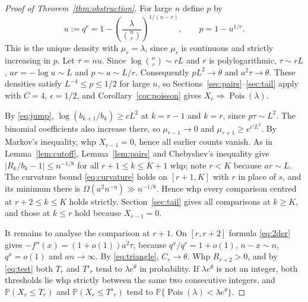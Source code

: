 \documentclass[11pt]{article}
\theoremstyle{remark}
\newcommand{\PP}{\mathbb P}
\newcommand{\Pois}{\operatorname{Pois}}
\begin{document}
\begin{proof}[Proof of Theorem~\ref{thm:obstruction}]
For large $n$ define $p$ by
\begin{equation}
 u:=q^r=1-\left(\frac{\lambda}{\binom nr}\right)^{1/(n-r)},
 \qquad p=1-u^{1/r}.
 \label{eq:tune}
\end{equation}
This is the unique density with $\mu_r=\lambda$, since $\mu_r$ is continuous and strictly increasing in $p$. Let $\tau=nu$. Since $\log\binom nr\sim rL$ and $r$ is polylogarithmic, $\tau\sim rL$, $ar=-\log u\sim L$ and $p\sim a\sim L/r$. Consequently $pL^2\to\theta$ and $a^2\tau\to\theta$. These densities satisfy $L^{-4}\le p\le1/2$ for large $n$, so Sections~\ref{sec:pairs}--\ref{sec:tail} apply with $C=4$, $\epsilon=1/2$, and Corollary~\ref{cor:poisson} gives $X_r\Rightarrow\Pois(\lambda)$.

By \eqref{eq:jump}, $\log(b_{k+1}/b_k)\ge cL^2$ at $k=r-1$ and $k=r$, since $p\tau\sim L^2$. The binomial coefficients also increase there, so $\mu_{r-1}\to0$ and $\mu_{r+1}\ge e^{c'L^2}$. By Markov's inequality, whp $X_{r-1}=0$, hence all earlier counts vanish. As in Lemma~\ref{lem:cutoff}, Lemma~\ref{lem:pairs} and Chebyshev's inequality give $|R_k/b_k-1|\le n^{-1/8}$ for all $r+1\le k\le K+1$ whp; note $r<K$ because $ar\sim L$. The curvature bound \eqref{eq:curvature} holds on $[r+1,K]$ with $r$ in place of $s$, and its minimum there is $\Omega(a^2n^{-\eta})\gg n^{-1/8}$. Hence whp every comparison centred at $r+2\le k\le K$ holds strictly. Section~\ref{sec:tail} gives all comparisons at $k\ge K$, and those at $k\le r$ hold because $X_{r-1}=0$.

It remains to analyse the comparison at $r+1$. On $[r,r+2]$ formula \eqref{eq:2der} gives $-f''(x)=(1+o(1))a^2\tau$, because $q^x/q^r=1+o(1)$, $n-x\sim n$, $q^x=o(1)$ and $an\to\infty$. By \eqref{eq:triangle}, $C_r\to\theta$. Whp $R_{r+2}>0$, and by \eqref{eq:test} both $T_r$ and $T'_r$ tend to $\lambda e^\theta$ in probability. If $\lambda e^\theta$ is not an integer, both thresholds lie whp strictly between the same two consecutive integers, and $\PP(X_r\le T_r)$ and $\PP(X_r\le T'_r)$ tend to $\PP\{\Pois(\lambda)<\lambda e^\theta\}$.


\end{proof}
\end{document}
